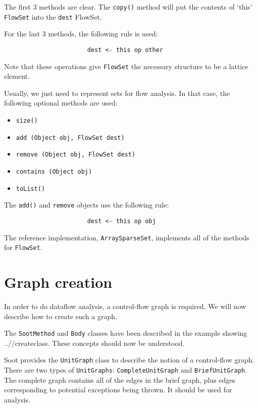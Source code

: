 \documentclass{article}
\begin{document}
The first 3 methods are clear.  The {\tt copy()} method
will put the contents of `this' {\tt FlowSet} into the
{\tt dest} FlowSet.  

For the last 3 methods, the following rule is used:

\begin{verbatim}
                       dest <- this op other
\end{verbatim}

Note that these operations give {\tt FlowSet} the necessary
structure to be a lattice element.  

Usually, we just need to represent sets for flow analysis.  In that
case, the following optional methods are used:
\begin{itemize}
\item {\tt size()}
\item {\tt add (Object obj, FlowSet dest)}
\item {\tt remove (Object obj, FlowSet dest)}
\item {\tt contains (Object obj)}
\item {\tt toList()}
\end{itemize}

The {\tt add()} and {\tt remove} objects use the following rule:

\begin{verbatim}
                       dest <- this op obj
\end{verbatim}

The reference implementation, {\tt ArraySparseSet}, implements all
of the methods for {\tt FlowSet}.

\section{Graph creation}

In order to do dataflow analysis, a control-flow graph is required.
We will now describe how to create such a graph.

The {\tt SootMethod} and {\tt Body} classes have been described in the
example showing 
{..//createclass}.
These concepts should now be understood.  

Soot provides the {\tt UnitGraph} class to describe the notion of
a control-flow graph.  There are two types of {\tt UnitGraphs}:
{\tt CompleteUnitGraph} and {\tt BriefUnitGraph}.  The complete graph
contains all of the edges in the brief graph, plus edges corresponding
to potential exceptions being thrown.  It should be used for analysis.
\end{document}
